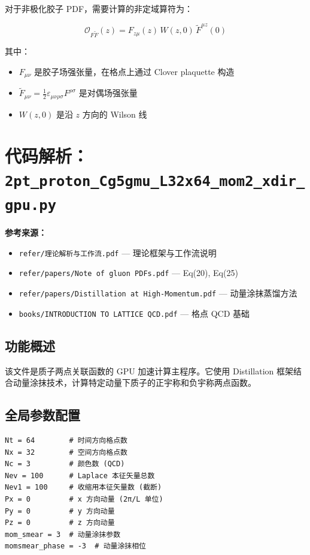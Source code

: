 \documentclass[12pt,a4paper]{ctexart}
\begin{document}
对于非极化胶子 PDF，需要计算的非定域算符为：

\begin{equation}
\mathcal{O}_{F\tilde{F}}(z) = F_{z\mu}(z) \, W(z, 0) \, \tilde{F}^{\mu z}(0)
\end{equation}

其中：
\begin{itemize}
    \item $F_{\mu\nu}$ 是胶子场强张量，在格点上通过 Clover plaquette 构造
    \item $\tilde{F}_{\mu\nu} = \frac{1}{2}\varepsilon_{\mu\nu\rho\sigma}F^{\rho\sigma}$ 是对偶场强张量
    \item $W(z, 0)$ 是沿 $z$ 方向的 Wilson 线
\end{itemize}

\section{代码解析：\texttt{2pt\_proton\_Cg5gmu\_L32x64\_mom2\_xdir\_gpu.py}}
\label{sec:2pt}

\textbf{参考来源：}
\begin{itemize}
    \item \texttt{refer/理论解析与工作流.pdf} — 理论框架与工作流说明
    \item \texttt{refer/papers/Note of gluon PDFs.pdf} — Eq(20), Eq(25)
    \item \texttt{refer/papers/Distillation at High-Momentum.pdf} — 动量涂抹蒸馏方法
    \item \texttt{books/INTRODUCTION TO LATTICE QCD.pdf} — 格点 QCD 基础
\end{itemize}

\subsection{功能概述}

该文件是质子两点关联函数的 GPU 加速计算主程序。它使用 Distillation 框架结合动量涂抹技术，计算特定动量下质子的正宇称和负宇称两点函数。

\subsection{全局参数配置}

\begin{lstlisting}[caption={全局参数配置}]
Nt = 64        # 时间方向格点数
Nx = 32        # 空间方向格点数
Nc = 3         # 颜色数 (QCD)
Nev = 100      # Laplace 本征矢量总数
Nev1 = 100     # 收缩用本征矢量数 (截断)
Px = 0         # x 方向动量 (2π/L 单位)
Py = 0         # y 方向动量
Pz = 0         # z 方向动量
mom_smear = 3  # 动量涂抹参数
momsmear_phase = -3  # 动量涂抹相位
\end{lstlisting}
\end{document}
